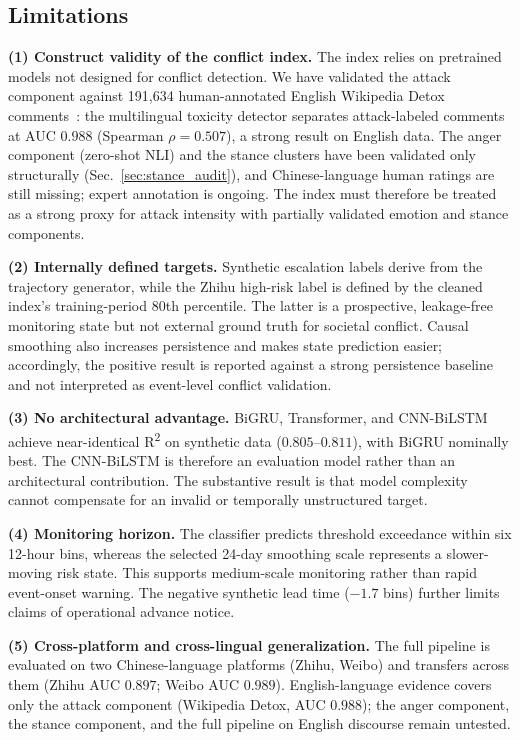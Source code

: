 \documentclass[journal]{IEEEtran}
\begin{document}
\subsection{Limitations}\label{sec:limitations}

\textbf{(1) Construct validity of the conflict index.} The index relies on pretrained models not designed for conflict detection. We have validated the attack component against 191,634 human-annotated English Wikipedia Detox comments~\cite{Wulczyn2017}: the multilingual toxicity detector separates attack-labeled comments at AUC $0.988$ (Spearman $\rho=0.507$), a strong result on English data. The anger component (zero-shot NLI) and the stance clusters have been validated only structurally (Sec.~\ref{sec:stance_audit}), and Chinese-language human ratings are still missing; expert annotation is ongoing. The index must therefore be treated as a strong proxy for attack intensity with partially validated emotion and stance components.

\textbf{(2) Internally defined targets.} Synthetic escalation labels derive from the trajectory generator, while the Zhihu high-risk label is defined by the cleaned index's training-period 80th percentile. The latter is a prospective, leakage-free monitoring state but not external ground truth for societal conflict. Causal smoothing also increases persistence and makes state prediction easier; accordingly, the positive result is reported against a strong persistence baseline and not interpreted as event-level conflict validation.

\textbf{(3) No architectural advantage.} BiGRU, Transformer, and CNN-BiLSTM achieve near-identical R\textsuperscript{2} on synthetic data ($0.805$--$0.811$), with BiGRU nominally best. The CNN-BiLSTM is therefore an evaluation model rather than an architectural contribution. The substantive result is that model complexity cannot compensate for an invalid or temporally unstructured target.

\textbf{(4) Monitoring horizon.} The classifier predicts threshold exceedance within six 12-hour bins, whereas the selected 24-day smoothing scale represents a slower-moving risk state. This supports medium-scale monitoring rather than rapid event-onset warning. The negative synthetic lead time ($-1.7$ bins) further limits claims of operational advance notice.

\textbf{(5) Cross-platform and cross-lingual generalization.} The full pipeline is evaluated on two Chinese-language platforms (Zhihu, Weibo) and transfers across them (Zhihu AUC $0.897$; Weibo AUC $0.989$). English-language evidence covers only the attack component (Wikipedia Detox, AUC $0.988$); the anger component, the stance component, and the full pipeline on English discourse remain untested.
\end{document}
